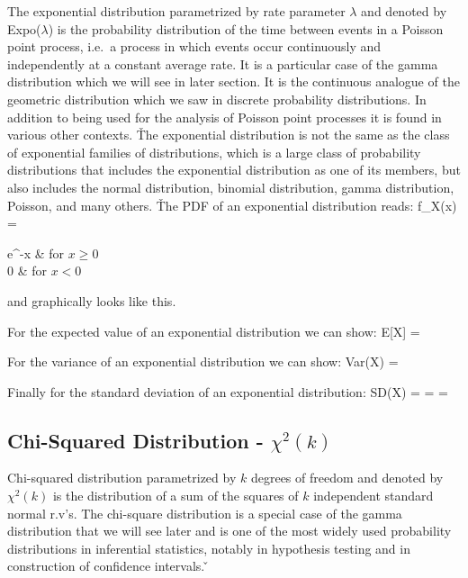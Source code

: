 The exponential distribution parametrized by rate parameter $\lambda$ and denoted by Expo($\lambda$) is the
probability distribution of the time between events in a Poisson point process, i.e.\ a process in which events occur
continuously and independently at a constant average rate. It is a particular case of the gamma distribution which we
will see in later section. It is the continuous analogue of the geometric distribution which we saw in discrete
probability distributions. In addition to being used for the analysis of Poisson point processes it is found in
various other contexts. \v

The exponential distribution is not the same as the class of exponential families of distributions, which is a large
class of probability distributions that includes the exponential distribution as one of its members, but also
includes the normal distribution, binomial distribution, gamma distribution, Poisson, and many others. \v

The PDF of an exponential distribution reads:
\bse
f_{X}(x) = \begin{cases*} \lambda e^{-\lambda x} & for $x \geq 0$ \\ 0 & for $x < 0$ \end{cases*}
\ese
\ed

and graphically looks like this.

\vspace{-5pt}


For the expected value of an exponential distribution we can show:
\bse
E[X] = 
\ese

For the variance of an exponential distribution we can show:
\bse
Var(X) = 
\ese

Finally for the standard deviation of an exponential distribution:
\bse
SD(X) =  =  = 
\ese

\subsection{Chi-Squared Distribution - $\chi^2(k)$}

Chi-squared distribution parametrized by $k$ degrees of freedom and denoted by $\chi^2(k)$ is the distribution of a
sum of the squares of $k$ independent standard normal r.v's. The chi-square distribution is a special case of the
gamma distribution that we will see later and is one of the most widely used probability distributions in inferential
statistics, notably in hypothesis testing and in construction of confidence intervals. \v


